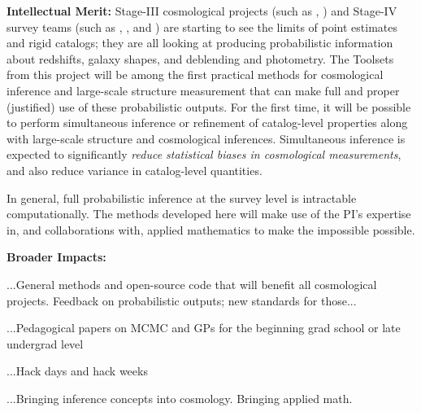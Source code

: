 \documentclass[12pt]{article}
\begin{document}
\noindent
\textbf{Intellectual Merit:}
Stage-III cosmological projects (such as \sdss, \des)
and Stage-IV survey teams (such as \lsst, \euclid, and \wfirst)
are starting to see the limits of point estimates and rigid catalogs;
they are all looking at producing probabilistic information about redshifts,
galaxy shapes, and deblending and photometry.
The Toolsets from this project will be among the first practical methods for
cosmological inference and large-scale structure measurement that can
make full and proper (justified) use of these probabilistic outputs.
For the first time, it will be possible to perform
simultaneous inference or refinement of catalog-level properties along with
large-scale structure and cosmological inferences.
Simultaneous inference is expected to significantly \emph{reduce statistical
biases in cosmological measurements},
and also reduce variance in catalog-level quantities.

In general, full probabilistic inference at the survey level is intractable computationally.
The methods developed here will make use of the PI's expertise in, and collaborations with,
applied mathematics to make the impossible possible.

\noindent
\textbf{Broader Impacts:}

...General methods and open-source code that will benefit all cosmological projects.
Feedback on probabilistic outputs; new standards for those...

...Pedagogical papers on MCMC and GPs for the beginning grad school or late undergrad level

...Hack days and hack weeks

...Bringing inference concepts into cosmology.  Bringing applied math.
\end{document}
